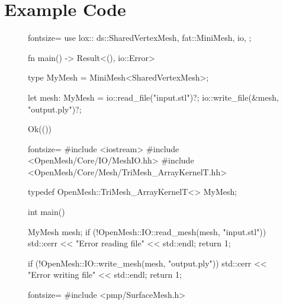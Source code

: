\newpage
\section{Example Code}

\begin{figure}[p]
  \begin{minipage}{.04\textwidth}
  \end{minipage}
  \begin{minipage}{.9\textwidth}
    \begin{rustcode*}{fontsize=\footnotesize}
      use lox::{
          ds::SharedVertexMesh,
          fat::MiniMesh,
          io,
      };

      fn main() -> Result<(), io::Error> {
          type MyMesh = MiniMesh<SharedVertexMesh>;

          let mesh: MyMesh = io::read_file("input.stl")?;
          io::write_file(&mesh, "output.ply")?;

          Ok(())
      }
    \end{rustcode*}
  \end{minipage}\vspace{2mm}

  \begin{minipage}{.04\textwidth}
  \end{minipage}
  \begin{minipage}{.9\textwidth}
    \begin{cppcode*}{fontsize=\footnotesize}
      #include <iostream>
      #include <OpenMesh/Core/IO/MeshIO.hh>
      #include <OpenMesh/Core/Mesh/TriMesh_ArrayKernelT.hh>

      typedef OpenMesh::TriMesh_ArrayKernelT<> MyMesh;

      int main() {
          MyMesh mesh;
          if (!OpenMesh::IO::read_mesh(mesh, "input.stl")) {
              std::cerr << "Error reading file" << std::endl;
              return 1;
          }

          if (!OpenMesh::IO::write_mesh(mesh, "output.ply")) {
              std::cerr << "Error writing file" << std::endl;
              return 1;
          }
      }
    \end{cppcode*}
  \end{minipage}\vspace{2mm}

  \begin{minipage}{.04\textwidth}
  \end{minipage}
  \begin{minipage}{.9\textwidth}
    \begin{cppcode*}{fontsize=\footnotesize}
      #include <pmp/SurfaceMesh.h>


\end{cppcode*}
\end{minipage}
\end{figure}
